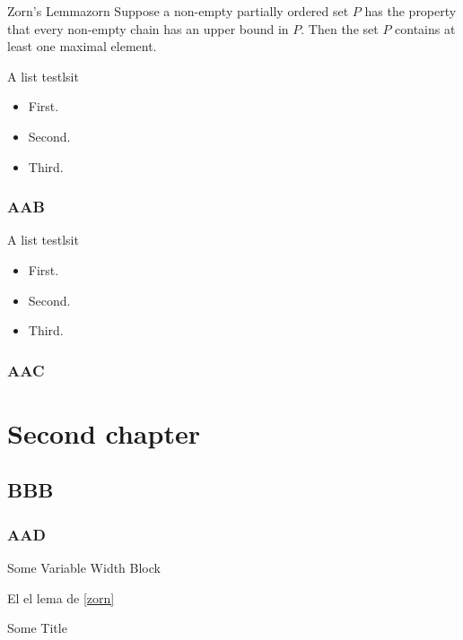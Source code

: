 \documentclass[twoside]{libro-matua}
\begin{document}
\begin{lema}{Zorn's Lemma}{zorn}
Suppose a non-empty partially ordered set $P$ has the property that every non-empty chain has an upper bound in $P$. Then the set $P$ contains at least one maximal element.
\end{lema}
\begin{lema}{A list test}{lsit}
\begin{itemize}
\item First.
\item Second.
\item Third.
\end{itemize}
\end{lema}

\subsection{AAB}
\lipsum
\begin{lema}{A list test}{lsit}
\begin{itemize}
\item First.
\item Second.
\item Third.
\end{itemize}
\end{lema}
\subsection{AAC}
\begin{nota}
\lipsum
\end{nota}
\lipsum[4]
\chapter{Second chapter}
\PartialToc
\section{BBB}
\subsection{AAD}
\begin{MyBlock}{Some Variable Width Block}
\lipsum[4]
\end{MyBlock}
El el lema de \ref{zorn}
\begin{MyBlock}[.5\linewidth]{Some Title}
\lipsum[4]
\end{MyBlock}
\lipsum
\end{document}
